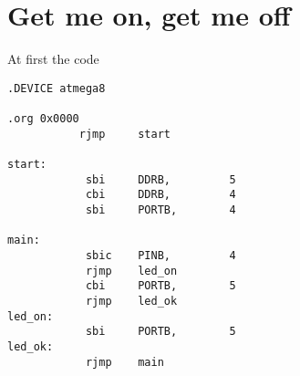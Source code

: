 \section{Get me on, get me off}

At first the code

\begin{lstlisting}
.DEVICE atmega8

.org 0x0000
           rjmp     start

start:
            sbi     DDRB,         5
            cbi     DDRB,         4
            sbi     PORTB,        4

main:
            sbic    PINB,         4
            rjmp    led_on
            cbi     PORTB,        5
            rjmp    led_ok
led_on:
            sbi     PORTB,        5
led_ok:
            rjmp    main
\end{lstlisting}
